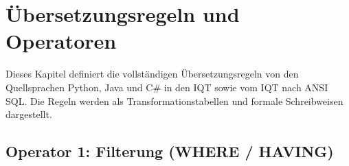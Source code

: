 ﻿%
\section{Übersetzungsregeln und Operatoren}
\label{sec:operatoren}

Dieses Kapitel definiert die vollständigen Übersetzungsregeln von den
Quellsprachen Python, Java und C\# in den IQT sowie vom IQT nach ANSI SQL.
Die Regeln werden als Transformationstabellen und formale Schreibweisen
dargestellt.

\subsection{Operator 1: Filterung (WHERE / HAVING)}
\label{subsec:op_filter}

